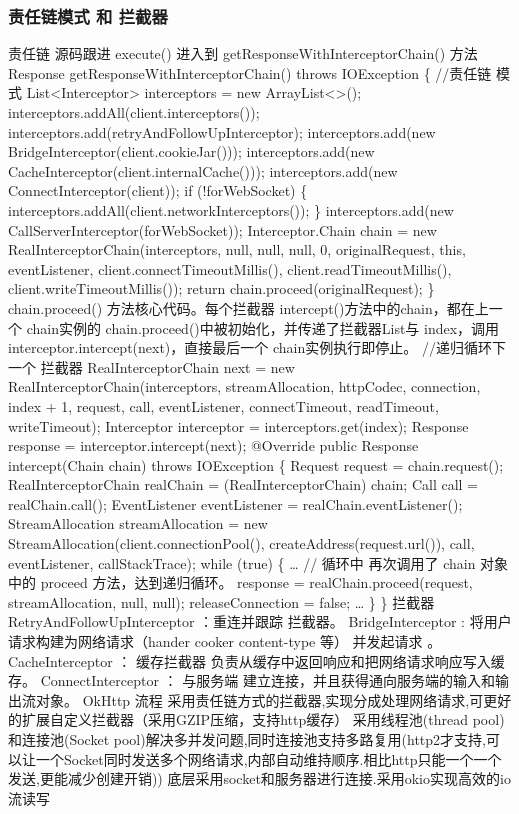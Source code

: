 \documentclass[9pt, b5paper]{article}
\begin{document}
\subsubsection{责任链模式 和 拦截器}
\label{sec-9-2-1}
责任链
源码跟进 execute() 进入到 getResponseWithInterceptorChain() 方法
Response getResponseWithInterceptorChain() throws IOException \{
    //责任链 模式
    List<Interceptor> interceptors = new ArrayList<>();
    interceptors.addAll(client.interceptors());
    interceptors.add(retryAndFollowUpInterceptor);
    interceptors.add(new BridgeInterceptor(client.cookieJar()));
    interceptors.add(new CacheInterceptor(client.internalCache()));
    interceptors.add(new ConnectInterceptor(client));
    if (!forWebSocket) \{
      interceptors.addAll(client.networkInterceptors());
    \}
    interceptors.add(new CallServerInterceptor(forWebSocket));
    Interceptor.Chain chain = new RealInterceptorChain(interceptors, null, null, null, 0,
        originalRequest, this, eventListener, client.connectTimeoutMillis(),
        client.readTimeoutMillis(), client.writeTimeoutMillis());
    return chain.proceed(originalRequest);
  \}
chain.proceed() 方法核心代码。每个拦截器 intercept()方法中的chain，都在上一个 chain实例的 chain.proceed()中被初始化，并传递了拦截器List与 index，调用interceptor.intercept(next)，直接最后一个 chain实例执行即停止。
//递归循环下一个 拦截器
    RealInterceptorChain next = new RealInterceptorChain(interceptors, streamAllocation, httpCodec,
        connection, index + 1, request, call, eventListener, connectTimeout, readTimeout,
        writeTimeout);
    Interceptor interceptor = interceptors.get(index);
    Response response = interceptor.intercept(next);
@Override public Response intercept(Chain chain) throws IOException \{
    Request request = chain.request();
    RealInterceptorChain realChain = (RealInterceptorChain) chain;
    Call call = realChain.call();
    EventListener eventListener = realChain.eventListener();
    StreamAllocation streamAllocation = new StreamAllocation(client.connectionPool(),
        createAddress(request.url()), call, eventListener, callStackTrace);
    while (true) \{
        \ldots{}
        // 循环中 再次调用了 chain 对象中的 proceed 方法，达到递归循环。
        response = realChain.proceed(request, streamAllocation, null, null);
        releaseConnection = false;
        \ldots{}
    \}
\}
拦截器
RetryAndFollowUpInterceptor ：重连并跟踪 拦截器。
BridgeInterceptor : 将用户请求构建为网络请求（hander cooker content-type 等） 并发起请求 。
CacheInterceptor ： 缓存拦截器 负责从缓存中返回响应和把网络请求响应写入缓存。
ConnectInterceptor ： 与服务端 建立连接，并且获得通向服务端的输入和输出流对象。
OkHttp 流程
采用责任链方式的拦截器,实现分成处理网络请求,可更好的扩展自定义拦截器（采用GZIP压缩，支持http缓存）
采用线程池(thread pool)和连接池(Socket pool)解决多并发问题,同时连接池支持多路复用(http2才支持,可以让一个Socket同时发送多个网络请求,内部自动维持顺序.相比http只能一个一个发送,更能减少创建开销))
底层采用socket和服务器进行连接.采用okio实现高效的io流读写
\end{document}
